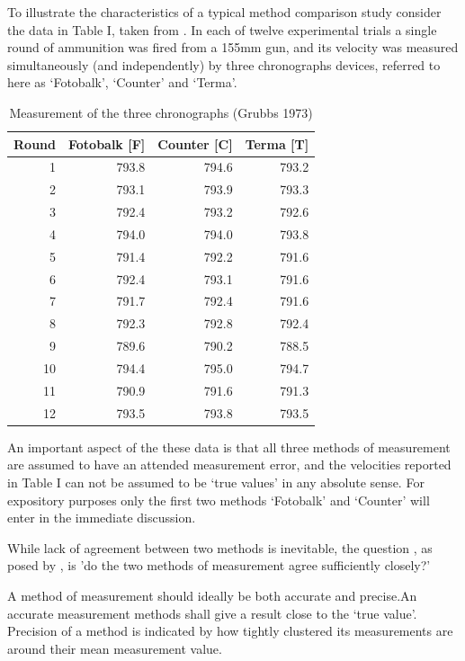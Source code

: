 \documentclass[12pt, a4paper]{report}
\theoremstyle{plain}
\theoremstyle{definition}
\theoremstyle{remark}
\begin{document}
	To illustrate the characteristics of a typical method comparison study consider the data in Table I, taken from \citet{Grubbs73}.
	\smallskip
	In each of twelve experimental trials a single round of ammunition was fired from a 155mm gun, and its velocity was measured
	simultaneously (and independently) by three chronographs devices, referred to here as `Fotobalk', `Counter' and `Terma'.
	\smallskip
	
	
	\newpage
	
	\begin{table}[ht]
		\begin{center}
			\begin{tabular}{rrrr}
				\hline
				Round& Fotobalk [F] & Counter [C]& Terma [T]\\
				\hline
				1 & 793.8 & 794.6 & 793.2 \\
				2 & 793.1 & 793.9 & 793.3 \\
				3 & 792.4 & 793.2 & 792.6 \\
				4 & 794.0 & 794.0 & 793.8 \\
				5 & 791.4 & 792.2 & 791.6 \\
				6 & 792.4 & 793.1 & 791.6 \\
				7 & 791.7 & 792.4 & 791.6 \\
				8 & 792.3 & 792.8 & 792.4 \\
				9 & 789.6 & 790.2 & 788.5 \\
				10 & 794.4 & 795.0 & 794.7 \\
				11 & 790.9 & 791.6 & 791.3 \\
				12 & 793.5 & 793.8 & 793.5 \\
				\hline
			\end{tabular}
			\caption{Measurement of the three chronographs (Grubbs 1973)}
		\end{center}
	\end{table}
	
	An important aspect of the these data is that all three methods of
	measurement are assumed to have an attended measurement error, and
	the velocities reported in Table I can not be assumed to be `true
	values' in any absolute sense. For expository purposes only the
	first two methods `Fotobalk' and `Counter' will enter in the
	immediate discussion.
	
	While lack of agreement between two methods is inevitable, the question , as
	posed by \citet{BA83}, is 'do the two methods of measurement agree
	sufficiently closely?'
	
	A method of measurement should ideally be both accurate and
	precise.An accurate measurement methods shall give a result close
	to the `true value'. Precision of a method is indicated by how
	tightly clustered its measurements are around their mean
	measurement value.
	
\end{document}

